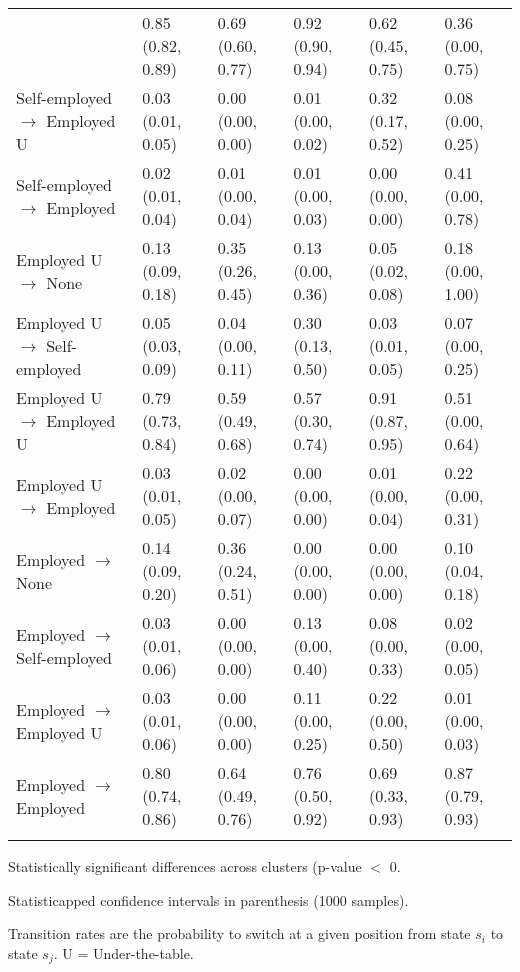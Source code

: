 \begin{table}[htp]
\begin{threeparttable}
\begin{tabular}{llllll}
{{{{{{{{{{{{{  \quad Self-employed $\rightarrow$ Self-employed & 0.85 (0.82, 0.89) & 0.69 (0.60, 0.77) & 0.92 (0.90, 0.94) & 0.62 (0.45, 0.75) & 0.36 (0.00, 0.75) \\ 
  \quad Self-employed $\rightarrow$ Employed U & 0.03 (0.01, 0.05) & 0.00 (0.00, 0.00) & 0.01 (0.00, 0.02) & 0.32 (0.17, 0.52) & 0.08 (0.00, 0.25) \\ 
  \quad Self-employed $\rightarrow$ Employed & 0.02 (0.01, 0.04) & 0.01 (0.00, 0.04) & 0.01 (0.00, 0.03) & 0.00 (0.00, 0.00) & 0.41 (0.00, 0.78) \\ 
   \addlinespace[12pt] 
\quad Employed U $\rightarrow$ None & 0.13 (0.09, 0.18) & 0.35 (0.26, 0.45) & 0.13 (0.00, 0.36) & 0.05 (0.02, 0.08) & 0.18 (0.00, 1.00) \\ 
  \quad Employed U $\rightarrow$ Self-employed & 0.05 (0.03, 0.09) & 0.04 (0.00, 0.11) & 0.30 (0.13, 0.50) & 0.03 (0.01, 0.05) & 0.07 (0.00, 0.25) \\ 
  \quad Employed U $\rightarrow$ Employed U & 0.79 (0.73, 0.84) & 0.59 (0.49, 0.68) & 0.57 (0.30, 0.74) & 0.91 (0.87, 0.95) & 0.51 (0.00, 0.64) \\ 
  \quad Employed U $\rightarrow$ Employed & 0.03 (0.01, 0.05) & 0.02 (0.00, 0.07) & 0.00 (0.00, 0.00) & 0.01 (0.00, 0.04) & 0.22 (0.00, 0.31) \\ 
   \addlinespace[12pt] 
\quad Employed $\rightarrow$ None & 0.14 (0.09, 0.20) & 0.36 (0.24, 0.51) & 0.00 (0.00, 0.00) & 0.00 (0.00, 0.00) & 0.10 (0.04, 0.18) \\ 
  \quad Employed $\rightarrow$ Self-employed & 0.03 (0.01, 0.06) & 0.00 (0.00, 0.00) & 0.13 (0.00, 0.40) & 0.08 (0.00, 0.33) & 0.02 (0.00, 0.05) \\ 
  \quad Employed $\rightarrow$ Employed U & 0.03 (0.01, 0.06) & 0.00 (0.00, 0.00) & 0.11 (0.00, 0.25) & 0.22 (0.00, 0.50) & 0.01 (0.00, 0.03) \\ 
  \quad Employed $\rightarrow$ Employed & 0.80 (0.74, 0.86) & 0.64 (0.49, 0.76) & 0.76 (0.50, 0.92) & 0.69 (0.33, 0.93) & 0.87 (0.79, 0.93) \\ 
  \addlinespace
\addlinespace
\addlinespace
\hline
\addlinespace
\end{tabular}
\begin{tablenotes}
\scriptsize
\item * Statistically significant differences across clusters (p-value $<$ 0.\item * Statisticapped confidence intervals in parenthesis (1000 samples).
\item Transition rates are the probability to switch at a given position from state $s_i$ to state $s_j$. U = Under-the-table.
\end{tablenotes}
\end{threeparttable}
\end{table}
